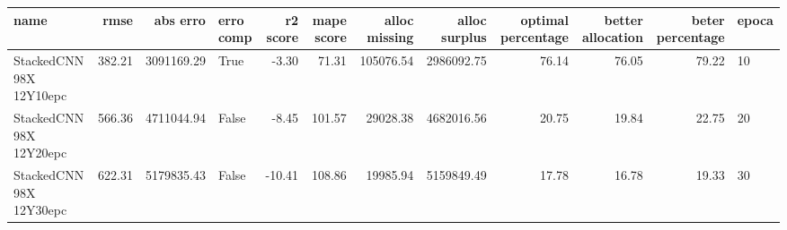 \begin{tabular}{lrrlrrrrrrrl}
\toprule
name & rmse & abs erro & erro comp & r2 score & mape score & alloc missing & alloc surplus & optimal percentage & better allocation & beter percentage & epoca \\
\midrule
StackedCNN 98X 12Y10epc & 382.21 & 3091169.29 & True & -3.30 & 71.31 & 105076.54 & 2986092.75 & 76.14 & 76.05 & 79.22 & 10 \\
StackedCNN 98X 12Y20epc & 566.36 & 4711044.94 & False & -8.45 & 101.57 & 29028.38 & 4682016.56 & 20.75 & 19.84 & 22.75 & 20 \\
StackedCNN 98X 12Y30epc & 622.31 & 5179835.43 & False & -10.41 & 108.86 & 19985.94 & 5159849.49 & 17.78 & 16.78 & 19.33 & 30 \\
\bottomrule
\end{tabular}

